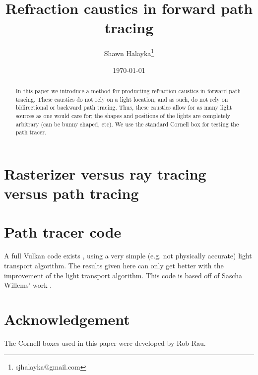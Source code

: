 \documentclass[12pt]{article}
\title{Refraction caustics in forward path tracing}
\author{
Shawn Halayka\footnote{sjhalayka@gmail.com}
}
\date{\today\;\currenttime}
\begin{document}
\newcommand{\abs}[1]{\lvert#1\rvert}



\maketitle




\begin{abstract}
In this paper we introduce a method for producting refraction caustics in forward path tracing.
These caustics do not rely on a light location, and as such, do not rely on bidirectional or backward path tracing.
Thus, these caustics allow for as many light sources as one would care for; the shapes and positions of the lights are completely arbitrary (can be bunny shaped, etc).
We use the standard Cornell box for testing the path tracer.
\end{abstract}

\section{Rasterizer versus ray tracing versus path tracing}






\section{Path tracer code}
A full Vulkan code exists \cite{halayka}, using a very simple (e.g. not physically accurate) light transport algorithm.
The results given here can only get better with the improvement of the light transport algorithm.
This code is based off of Sascha Willems' work \cite{willems1, willems2}.



\section{Acknowledgement}

The Cornell boxes used in this paper were developed by Rob Rau.
\end{document}
